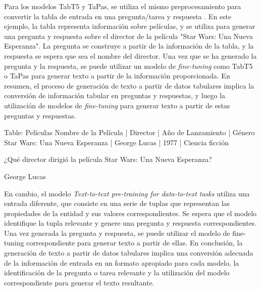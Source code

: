 Para los modelos TabT5 y TaPas, se utiliza el mismo preprocesamiento para convertir la tabla de entrada en una pregunta/tarea y respuesta \cite{andrejczuk_table--text_2022, herzig_tapas_2020}. En este ejemplo, la tabla representa información sobre películas, y se utiliza para generar una pregunta y respuesta sobre el director de la película "Star Wars: Una Nueva Esperanza". La pregunta se construye a partir de la información de la tabla, y la respuesta se espera que sea el nombre del director. Una vez que se ha generado la pregunta y la respuesta, se puede utilizar un modelo de \emph{fine-tuning} como TabT5 o TaPas para generar texto a partir de la información proporcionada. En resumen, el proceso de generación de texto a partir de datos tabulares implica la conversión de información tabular en preguntas y respuestas, y luego la utilización de modelos de \emph{fine-tuning} para generar texto a partir de estas preguntas y respuestas.
\begin{tcolorbox}[colback=white,colframe=black!50!white,title=Input]
Table: Películas
Nombre de la Película     | Director                | Año de Lanzamiento | Género 
Star Wars: Una Nueva Esperanza | George Lucas        | 1977              | Ciencia ficción 
\end{tcolorbox}
\begin{tcolorbox}[colback=white,colframe=black!50!white,title=Pregunta]
¿Qué director dirigió la película Star Wars: Una Nueva Esperanza?
\end{tcolorbox}
\begin{tcolorbox}[colback=white,colframe=black!50!white,title=Respuesta esperada]
George Lucas
\end{tcolorbox}


En cambio, el modelo \emph{Text-to-text pre-training for data-to-text tasks} \cite{kale_text--text_2020} utiliza una entrada diferente, que consiste en una serie de tuplas que representan las propiedades de la entidad y sus valores correspondientes. Se espera que el modelo identifique la tupla relevante y genere una pregunta y respuesta correspondientes. Una vez generada la pregunta y respuesta, se puede utilizar el modelo de fine-tuning correspondiente para generar texto a partir de ellas. En conclusión, la generación de texto a partir de datos tabulares implica una conversión adecuada de la información de entrada en un formato apropiado para cada modelo, la identificación de la pregunta o tarea relevante y la utilización del modelo correspondiente para generar el texto resultante.


